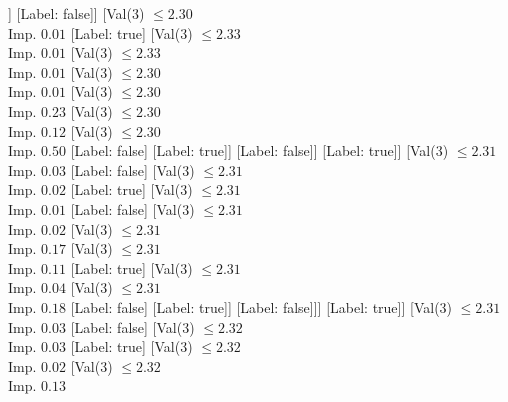 \documentclass[margin=10pt]{standalone}
\begin{document}
\begin{forest}
														[Val($3$) $ \leq 2.30$ \\ Imp. $0.05$
															[Val($3$) $ \leq 2.30$ \\ Imp. $0.44$
																[Label: false]
																[Label: true]]
															[Label: false]]
														[Val($3$) $ \leq 2.30$ \\ Imp. $0.01$
															[Label: true]
															[Val($3$) $ \leq 2.33$ \\ Imp. $0.01$
																[Val($3$) $ \leq 2.33$ \\ Imp. $0.01$
																	[Val($3$) $ \leq 2.30$ \\ Imp. $0.01$
																		[Val($3$) $ \leq 2.30$ \\ Imp. $0.23$
																			[Val($3$) $ \leq 2.30$ \\ Imp. $0.12$
																				[Val($3$) $ \leq 2.30$ \\ Imp. $0.50$
																					[Label: false]
																					[Label: true]]
																				[Label: false]]
																			[Label: true]]
																		[Val($3$) $ \leq 2.31$ \\ Imp. $0.03$
																			[Label: false]
																			[Val($3$) $ \leq 2.31$ \\ Imp. $0.02$
																				[Label: true]
																				[Val($3$) $ \leq 2.31$ \\ Imp. $0.01$
																					[Label: false]
																					[Val($3$) $ \leq 2.31$ \\ Imp. $0.02$
																						[Val($3$) $ \leq 2.31$ \\ Imp. $0.17$
																							[Val($3$) $ \leq 2.31$ \\ Imp. $0.11$
																								[Label: true]
																								[Val($3$) $ \leq 2.31$ \\ Imp. $0.04$
																									[Val($3$) $ \leq 2.31$ \\ Imp. $0.18$
																										[Label: false]
																										[Label: true]]
																									[Label: false]]]
																							[Label: true]]
																						[Val($3$) $ \leq 2.31$ \\ Imp. $0.03$
																							[Label: false]
																							[Val($3$) $ \leq 2.32$ \\ Imp. $0.03$
																								[Label: true]
																								[Val($3$) $ \leq 2.32$ \\ Imp. $0.02$
																									[Val($3$) $ \leq 2.32$ \\ Imp. $0.13$

\end{forest}
\end{document}
